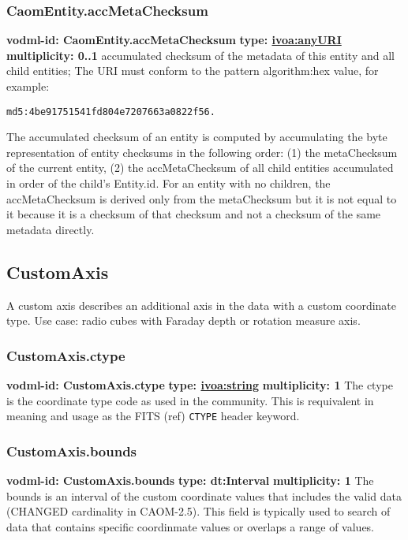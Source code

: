     \subsubsection{CaomEntity.accMetaChecksum}
      \textbf{vodml-id: CaomEntity.accMetaChecksum} \newline
      \textbf{type: \hyperref[sect:ivoa]{ivoa:anyURI}} \newline
      \textbf{multiplicity: 0..1} \newline
      accumulated checksum of the metadata of this entity and all child entities; The URI must conform to the pattern {algorithm}:{hex value}, for example: \begin{verbatim}md5:4be91751541fd804e7207663a0822f56.\end{verbatim} The accumulated checksum of an entity is computed by accumulating the byte representation of entity checksums in the following order: (1) the metaChecksum of the current entity, (2) the accMetaChecksum of all child entities accumulated in order of the child's Entity.id. For an entity with no children, the accMetaChecksum is derived only from the metaChecksum but it is not equal to it because it is a checksum of that checksum and not a checksum of the same metadata directly.

  \subsection{CustomAxis}
  \label{sect:CustomAxis}
    A custom axis describes an additional axis in the data with a custom coordinate type. Use case: radio cubes with Faraday depth or rotation measure axis.

    \subsubsection{CustomAxis.ctype}
      \textbf{vodml-id: CustomAxis.ctype} \newline
      \textbf{type: \hyperref[sect:ivoa]{ivoa:string}} \newline
      \textbf{multiplicity: 1} \newline
      The ctype is the coordinate type code as used in the community. This is requivalent in meaning and usage as the FITS (ref) \verb|CTYPE| header keyword.

    \subsubsection{CustomAxis.bounds}
      \textbf{vodml-id: CustomAxis.bounds} \newline
      \textbf{type: dt:Interval} \newline
      \textbf{multiplicity: 1} \newline
      The bounds is an interval of the custom coordinate values that includes the valid data (CHANGED cardinality in CAOM-2.5). This field is typically used to search of data that contains specific coordinmate values or overlaps a range of values.

